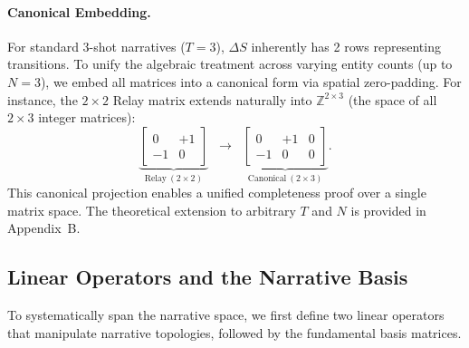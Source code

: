 \documentclass[sigconf,review,anonymous]{acmart}
\theoremstyle{definition}
\begin{document}
\paragraph{Canonical Embedding.}
For standard 3-shot narratives ($T\!=\!3$), $\Delta S$ inherently has 2 rows representing transitions. To unify the algebraic treatment across varying entity counts (up to $N=3$), we embed all matrices into a canonical form via spatial zero-padding. For instance, the $2\!\times\!2$ Relay matrix extends naturally into $\mathbb{Z}^{2 \times 3}$ (the space of all $2\!\times\!3$ integer matrices):
\begin{equation}
\underbrace{\begin{bmatrix} 0 & +1 \\ -1 & 0 \end{bmatrix}}_{\text{Relay}~(2\!\times\!2)}
\;\;\longrightarrow\;\;
\underbrace{\begin{bmatrix} 0 & +1 & 0 \\ -1 & 0 & 0 \end{bmatrix}}_{\text{Canonical}~(2\!\times\!3)}.
\label{eq:canonical}
\end{equation}
This canonical projection enables a unified completeness proof over a single matrix space. The theoretical extension to arbitrary $T$ and $N$ is provided in Appendix~B.

\subsection{Linear Operators and the Narrative Basis}
\label{sec:basis}



To systematically span the narrative space, we first define two linear operators that manipulate narrative topologies, followed by the fundamental basis matrices.
\end{document}
